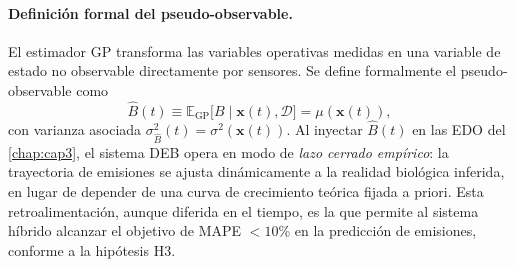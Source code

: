 \paragraph{Definición formal del pseudo-observable.}
El estimador GP transforma las variables operativas medidas en una variable de estado no observable directamente por sensores. Se define formalmente el pseudo-observable como
\begin{equation}
    \label{eq:cap4_pseudo_observable}
    \hat{B}(t) \equiv \mathbb{E}_{\mathrm{GP}}\bigl[B \mid \mathbf{x}(t), \mathcal{D}\bigr] = \mu(\mathbf{x}(t)),
\end{equation}
con varianza asociada $\sigma^{2}_{\hat{B}}(t) = \sigma^{2}(\mathbf{x}(t))$. Al inyectar $\hat{B}(t)$ en las EDO del \cref{chap:cap3}, el sistema DEB opera en modo de \emph{lazo cerrado empírico}: la trayectoria de emisiones se ajusta dinámicamente a la realidad biológica inferida, en lugar de depender de una curva de crecimiento teórica fijada a priori. Esta retroalimentación, aunque diferida en el tiempo, es la que permite al sistema híbrido alcanzar el objetivo de MAPE $< \num{10}$\% en la predicción de emisiones, conforme a la hipótesis H3.
